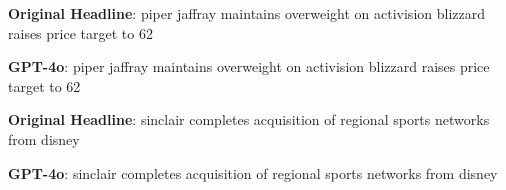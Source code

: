 \begin{tcolorbox}[colback=white,colframe=black!75!white] 
    \begin{minipage}{0.475\textwidth}
    \centering
    \begin{tcolorbox}[colback=black!5!white,colframe=black!75!white, fontupper=\small, fontlower=\small] 
    \textbf{Original Headline}: piper jaffray maintains overweight on activision blizzard raises price target to 62
    \end{tcolorbox}
    \end{minipage} 
    \hfill
    \begin{minipage}{0.475\textwidth}
    \centering
    \begin{tcolorbox}[colback=black!5!white,colframe=black!75!white, fontupper=\small, fontlower=\small] 
    \textbf{GPT-4o}: piper jaffray maintains overweight on activision blizzard raises price target to 62
    \end{tcolorbox}
    \end{minipage}
\end{tcolorbox}
\begin{tcolorbox}[colback=white,colframe=black!75!white] 
    \begin{minipage}{0.475\textwidth}
    \centering
    \begin{tcolorbox}[colback=black!5!white,colframe=black!75!white, fontupper=\small, fontlower=\small] 
    \textbf{Original Headline}: sinclair completes acquisition of regional sports networks from disney
    \end{tcolorbox}
    \end{minipage} 
    \hfill
    \begin{minipage}{0.475\textwidth}
    \centering
    \begin{tcolorbox}[colback=black!5!white,colframe=black!75!white, fontupper=\small, fontlower=\small] 
    \textbf{GPT-4o}: sinclair completes acquisition of regional sports networks from disney
    \end{tcolorbox}
    \end{minipage}
\end{tcolorbox}